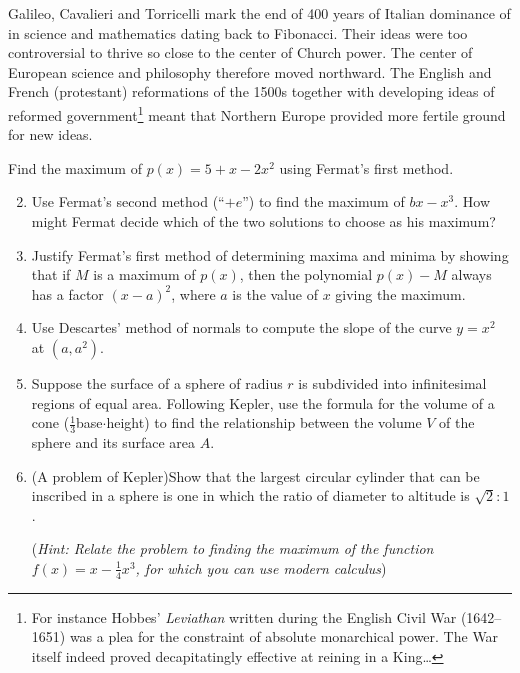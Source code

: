 Galileo, Cavalieri and Torricelli mark the end of 400 years of Italian dominance of in science and mathematics dating back to Fibonacci. Their ideas were too controversial to thrive so close to the center of Church power. The center of European science and philosophy therefore moved northward. The English and French (protestant) reformations of the 1500s together with developing ideas of reformed government\footnote{%
	For instance Hobbes' \emph{Leviathan} written during the English Civil War (1642--1651) was a plea for the constraint of absolute monarchical power. The War itself indeed proved decapitatingly effective at reining in a King\ldots%
}
meant that Northern Europe provided more fertile ground for new ideas.
\goodbreak


\begin{exercises}{}{}
	\exstart Find the maximum of $p(x)=5+x-2x^2$ using Fermat's first method.
	
	\begin{enumerate}\setcounter{enumi}{1}
		\item%
		Use Fermat's second method (``$+e$'') to find the maximum of $bx-x^3$. How might Fermat decide which of the two solutions to choose as his maximum?
	  
		\item%
		Justify Fermat's first method of determining maxima and minima by showing that if $M$ is a maximum of $p(x)$, then the polynomial $p(x)-M$ always has a factor $(x-a)^2$, where $a$ is the value of $x$ giving the maximum.
		
		
		\item Use Descartes' method of normals to compute the slope of the curve $y=x^2$ at $(a,a^2)$.
	
		\item Suppose the surface of a sphere of radius $r$ is subdivided into infinitesimal regions of equal area. Following Kepler, use the formula for the volume of a cone ($\frac 13$base$\cdot$height)	to find the relationship between the volume $V$ of the sphere and its surface area $A$.
			
	 	\item%
	 	(A problem of Kepler)\lstsp Show that the largest circular cylinder that can be inscribed in a sphere is one in which the ratio of diameter to altitude is $\sqrt 2:1$.\par
	 	(\emph{Hint: Relate the problem to finding the maximum of the function $f(x)=x-\frac 14x^3$, for which you can use modern calculus})
		

\end{enumerate}
\end{exercises}
